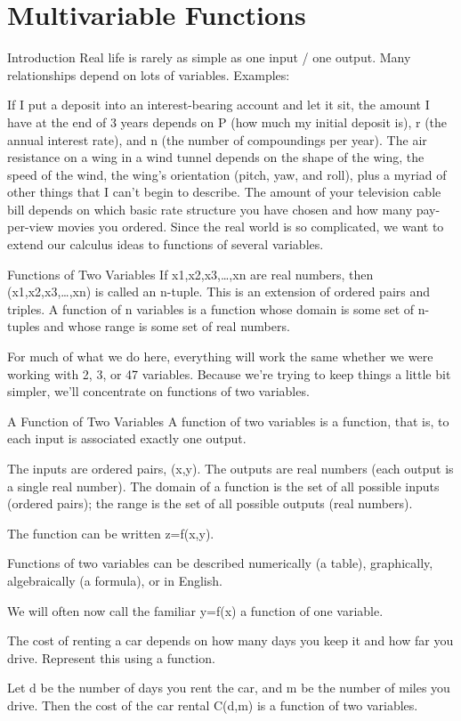 \section{Multivariable Functions}
\label{sec:multivariable-functions}

Introduction
Real life is rarely as simple as one input / one output. Many relationships depend on lots of variables. Examples:

If I put a deposit into an interest-bearing account and let it sit, the amount I have at the end of 3 years depends on P (how much my initial deposit is), r (the annual interest rate), and n (the number of compoundings per year).
The air resistance on a wing in a wind tunnel depends on the shape of the wing, the speed of the wind, the wing's orientation (pitch, yaw, and roll), plus a myriad of other things that I can't begin to describe.
The amount of your television cable bill depends on which basic rate structure you have chosen and how many pay-per-view movies you ordered.
Since the real world is so complicated, we want to extend our calculus ideas to functions of several variables.

Functions of Two Variables
If x1,x2,x3,…,xn are real numbers, then (x1,x2,x3,…,xn) is called an n-tuple. This is an extension of ordered pairs and triples. A function of n variables is a function whose domain is some set of n-tuples and whose range is some set of real numbers.

For much of what we do here, everything will work the same whether we were working with 2, 3, or 47 variables. Because we're trying to keep things a little bit simpler, we'll concentrate on functions of two variables.

A Function of Two Variables
A function of two variables is a function, that is, to each input is associated exactly one output.

The inputs are ordered pairs, (x,y). The outputs are real numbers (each output is a single real number). The domain of a function is the set of all possible inputs (ordered pairs); the range is the set of all possible outputs (real numbers).

The function can be written z=f(x,y).

Functions of two variables can be described numerically (a table), graphically, algebraically (a formula), or in English.

We will often now call the familiar y=f(x) a function of one variable.

\begin{example}
The cost of renting a car depends on how many days you keep it and how far you drive. Represent this using a function.

\begin{solution} Let d be the number of days you rent the car, and m be the number of miles you drive. Then the cost of the car rental C(d,m) is a function of two variables.
\end{solution}\end{example}

